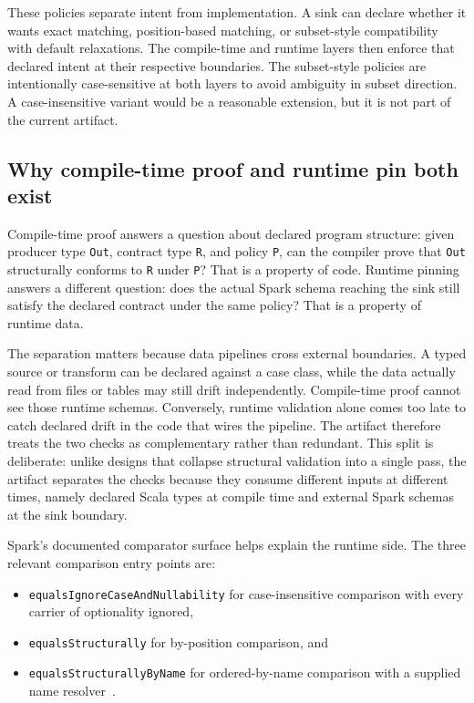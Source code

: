 These policies separate intent from implementation. A sink can declare whether it wants exact matching, position-based matching, or subset-style compatibility with default relaxations. The compile-time and runtime layers then enforce that declared intent at their respective boundaries.
The subset-style policies are intentionally case-sensitive at both layers to avoid ambiguity in subset direction. A case-insensitive variant would be a reasonable extension, but it is not part of the current artifact.

\subsection{Why compile-time proof and runtime pin both exist}
\label{sec:predicate-family}

Compile-time proof answers a question about declared program structure: given producer type \texttt{Out}, contract type \texttt{R}, and policy \texttt{P}, can the compiler prove that \texttt{Out} structurally conforms to \texttt{R} under \texttt{P}? That is a property of code. Runtime pinning answers a different question: does the actual Spark schema reaching the sink still satisfy the declared contract under the same policy? That is a property of runtime data.

The separation matters because data pipelines cross external boundaries. A typed source or transform can be declared against a case class, while the data actually read from files or tables may still drift independently. Compile-time proof cannot see those runtime schemas. Conversely, runtime validation alone comes too late to catch declared drift in the code that wires the pipeline. The artifact therefore treats the two checks as complementary rather than redundant. This split is deliberate: unlike designs that collapse structural validation into a single pass, the artifact separates the checks because they consume different inputs at different times, namely declared Scala types at compile time and external Spark schemas at the sink boundary.

Spark's documented comparator surface helps explain the runtime side. The three relevant comparison entry points are:

\begin{itemize}[leftmargin=1.5em]
  \item \texttt{equalsIgnoreCaseAndNullability} for case-insensitive comparison with every carrier of optionality ignored,
  \item \texttt{equalsStructurally} for by-position comparison, and
  \item \texttt{equalsStructurallyByName} for ordered-by-name comparison with a supplied name resolver~\cite{spark_datatype}.
\end{itemize}


